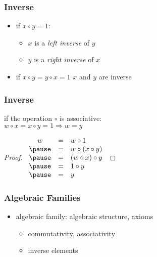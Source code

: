 \documentclass[dvipsnames]{beamer}
\begin{document}
\begin{frame}
  \frametitle{Inverse}

  \begin{itemize}
    \item if $x \circ y = 1$:
    \begin{itemize}
      \item $x$ is a \emph{left inverse} of $y$
      \item $y$ is a \emph{right inverse} of $x$
    \end{itemize}

    \medskip
    \item if $x \circ y = y \circ x = 1$
      $x$ and $y$ are \alert{inverse}
  \end{itemize}
\end{frame}

\begin{frame}
  \frametitle{Inverse}

  \begin{theorem}
    if the operation $\circ$ is associative:\\
    $w \circ x = x \circ y = 1 \Rightarrow w = y$
  \end{theorem}

  \pause
  \begin{proof}
    $\begin{array}{ccl}
      w & = & w \circ 1\\ \pause
        & = & w \circ (x \circ y)\\ \pause
        & = & (w \circ x) \circ y\\ \pause
        & = & 1 \circ y\\ \pause
        & = & y
    \end{array}$
  \end{proof}
\end{frame}

\begin{frame}
  \frametitle{Algebraic Families}

  \begin{itemize}
    \item \alert{algebraic family}: algebraic structure, axioms
    \begin{itemize}
      \item commutativity, associativity
      \item inverse elements
    \end{itemize}
  \end{itemize}
\end{frame}
\end{document}
